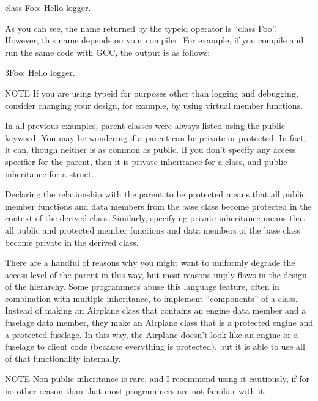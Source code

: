 \begin{shell}
class Foo: Hello logger.
\end{shell}

As you can see, the name returned by the typeid operator is “class Foo”. However, this name depends on your compiler. For example, if you compile and run the same code with GCC, the output is as follows:

\begin{cpp}
3Foo: Hello logger.
\end{cpp}

\begin{myNotic}{NOTE}
If you are using typeid for purposes other than logging and debugging, consider changing your design, for example, by using virtual member functions.
\end{myNotic}


In all previous examples, parent classes were always listed using the public keyword. You may be wondering if a parent can be private or protected. In fact, it can, though neither is as common as public. If you don’t specify any access specifier for the parent, then it is private inheritance for a class, and public inheritance for a struct.

Declaring the relationship with the parent to be protected means that all public member functions and data members from the base class become protected in the context of the derived class. Similarly, specifying private inheritance means that all public and protected member functions and data members of the base class become private in the derived class.

There are a handful of reasons why you might want to uniformly degrade the access level of the parent in this way, but most reasons imply flaws in the design of the hierarchy. Some programmers abuse this language feature, often in combination with multiple inheritance, to implement “components” of a class. Instead of making an Airplane class that contains an engine data member and a fuselage data member, they make an Airplane class that is a protected engine and a protected fuselage. In this way, the Airplane doesn’t look like an engine or a fuselage to client code (because everything is protected), but it is able to use all of that functionality internally.

\begin{myNotic}{NOTE}
Non-public inheritance is rare, and I recommend using it cautiously, if for no other reason than that most programmers are not familiar with it.
\end{myNotic}

